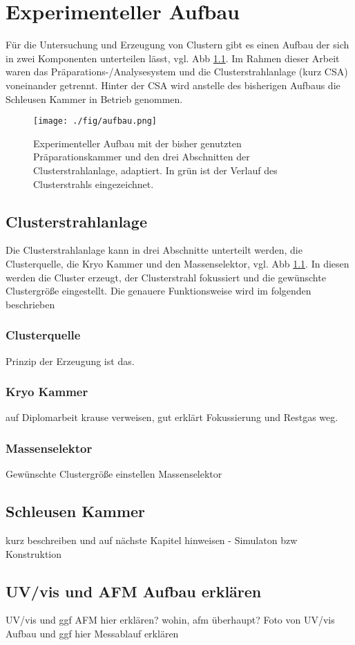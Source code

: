 \chapter{Experimenteller Aufbau}
Für die Untersuchung und Erzeugung von Clustern gibt es einen Aufbau der sich in zwei Komponenten unterteilen lässt, vgl. Abb \ref{fig:aufbau}.
Im Rahmen dieser Arbeit waren das Präparations-/Analysesystem und die Clusterstrahlanlage (kurz CSA) voneinander getrennt.
Hinter der CSA wird anstelle des bisherigen Aufbaus die Schleusen Kammer in Betrieb genommen.
\begin{figure}
    \centering
    \texttt{[image: ./fig/aufbau.png]}
    \caption{Experimenteller Aufbau mit der bisher genutzten Präparationskammer und den drei Abschnitten der Clusterstrahlanlage, \cite[S. 20]{wolter} adaptiert. 
    In grün ist der Verlauf des Clusterstrahls eingezeichnet.}
    \label{fig:aufbau}
\end{figure}
\section{Clusterstrahlanlage}
Die Clusterstrahlanlage kann in drei Abschnitte unterteilt werden, die Clusterquelle, die Kryo Kammer und den Massenselektor, vgl. Abb \ref{fig:aufbau}.
In diesen werden die Cluster erzeugt, der Clusterstrahl fokussiert und die gewünschte Clustergröße eingestellt. Die genauere Funktionsweise wird im folgenden beschrieben
\subsection{Clusterquelle}
Prinzip der Erzeugung ist das.
\subsection{Kryo Kammer}
auf Diplomarbeit krause verweisen, gut erklärt
Fokussierung und Restgas weg.
\subsection{Massenselektor}
Gewünschte Clustergröße einstellen 
Massenselektor \cite{Issendorff.1999}
\section{Schleusen Kammer}
kurz beschreiben und auf nächste Kapitel hinweisen - Simulaton bzw Konstruktion

\section{UV/vis und AFM Aufbau erklären}
UV/vis und ggf AFM hier erklären? wohin, afm überhaupt?
Foto von UV/vis Aufbau und ggf hier Messablauf erklären
